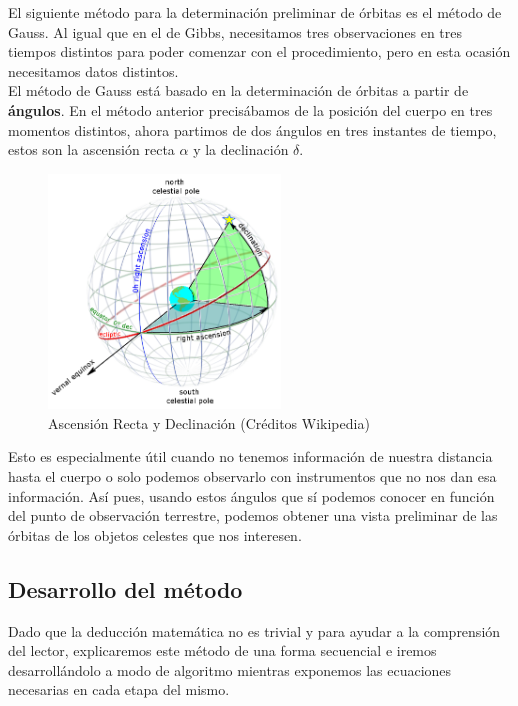 \documentclass{article}
\numberwithin{equation}{section}
\begin{document}
El siguiente método para la determinación preliminar de órbitas es el método de Gauss. Al igual que en el de Gibbs, necesitamos tres observaciones en tres tiempos distintos para poder comenzar con el procedimiento, pero en esta ocasión necesitamos datos distintos.\\

El método de Gauss está basado en la determinación de órbitas a partir de \textbf{ángulos}. En el método anterior precisábamos de la posición del cuerpo en tres momentos distintos, ahora partimos de dos ángulos en tres instantes de tiempo, estos son la ascensión recta $\alpha$ y la declinación $\delta$.
\newpage
\begin{figure}[h]
    \centering
    \includegraphics[width=0.55\textwidth]{ARyD.png}
    \caption{Ascensión Recta y Declinación (Créditos 
    Wikipedia)}
\end{figure} 
Esto es especialmente útil cuando no tenemos información de nuestra distancia hasta el cuerpo o solo podemos observarlo con instrumentos que no nos dan esa información. Así pues, usando estos ángulos que sí podemos conocer en función del punto de observación terrestre, podemos obtener una vista preliminar de las órbitas de los objetos celestes que nos interesen.\par

\subsection{Desarrollo del método}

Dado que la deducción matemática no es trivial y para ayudar a la comprensión del lector, explicaremos este método de una forma secuencial e iremos desarrollándolo a modo de algoritmo mientras exponemos las ecuaciones necesarias en cada etapa del mismo.\\
\end{document}
